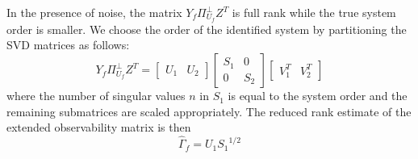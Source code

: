 In the presence of noise, the matrix $Y_f\Pi_{U_f}^\perp Z^T$ is full rank while the true system order is smaller. We choose the order of the identified system by partitioning the SVD matrices as follows:
\begin{equation*}
Y_f\Pi_{U_f}^\perp Z^T = 
\begin{bmatrix}U_1 & U_2\end{bmatrix}
\begin{bmatrix}S_1 & 0\\ 0 & S_2\end{bmatrix}
\begin{bmatrix}V_1^T & V_2^T\end{bmatrix}
\end{equation*}
where the number of singular values $n$ in $S_1$ is equal to the system order and the remaining submatrices are scaled appropriately. The reduced rank estimate of the extended observability matrix is then
\begin{equation}
\hat{\Gamma}_f = U_1 {S_1}^{1/2}
\end{equation}

